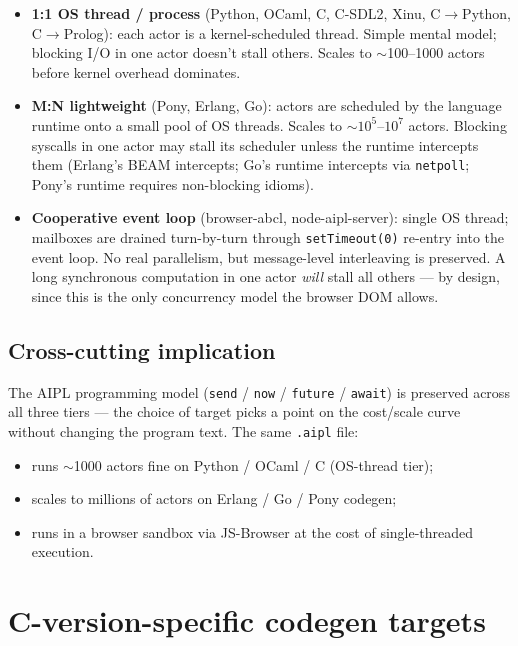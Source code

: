 \documentclass[10pt,a4paper,landscape]{article}
\begin{document}
\begin{itemize}[leftmargin=*,itemsep=0pt]
  \item \textbf{1:1 OS thread / process} (Python, OCaml, C, C-SDL2,
    Xinu, C$\to$Python, C$\to$Prolog): each actor is a kernel-scheduled thread.
    Simple mental model; blocking I/O in one actor doesn't stall
    others.  Scales to $\sim$100--1000 actors before kernel
    overhead dominates.
  \item \textbf{M:N lightweight} (Pony, Erlang, Go): actors are
    scheduled by the language runtime onto a small pool of OS
    threads.  Scales to $\sim 10^{5}$--$10^{7}$ actors.
    Blocking syscalls in one actor may stall its scheduler unless
    the runtime intercepts them (Erlang's BEAM intercepts; Go's
    runtime intercepts via \texttt{netpoll}; Pony's runtime
    requires non-blocking idioms).
  \item \textbf{Cooperative event loop} (browser-abcl,
    node-aipl-server): single OS thread; mailboxes are drained
    turn-by-turn through \texttt{setTimeout(0)} re-entry into the
    event loop.  No real parallelism, but message-level
    interleaving is preserved.  A long synchronous computation in
    one actor \emph{will} stall all others --- by design, since
    this is the only concurrency model the browser DOM allows.
\end{itemize}

\subsection*{Cross-cutting implication}

The AIPL programming model (\texttt{send} / \texttt{now} /
\texttt{future} / \texttt{await}) is preserved across all three
tiers --- the choice of target picks a point on the cost/scale
curve without changing the program text.  The same \texttt{.aipl}
file:
\begin{itemize}[leftmargin=*,itemsep=0pt]
  \item runs $\sim$1000 actors fine on Python / OCaml / C
    (OS-thread tier);
  \item scales to millions of actors on Erlang / Go / Pony codegen;
  \item runs in a browser sandbox via JS-Browser at the cost of
    single-threaded execution.
\end{itemize}

\clearpage

\section*{C-version-specific codegen targets}
\end{document}
